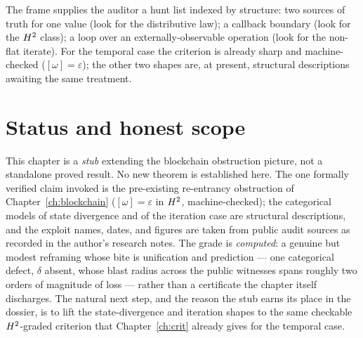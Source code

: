 The frame supplies the auditor a hunt list indexed by structure: two sources of
truth for one value (look for the distributive law); a callback boundary (look
for the $H^2$ class); a loop over an externally-observable operation (look for
the non-flat iterate). For the temporal case the criterion is already sharp and
machine-checked ($[\omega]=\varepsilon$); the other two shapes are, at present,
structural descriptions awaiting the same treatment.

\section{Status and honest scope}
\label{sec:security-status}

This chapter is a \emph{stub} extending the blockchain obstruction picture, not a
standalone proved result. No new theorem is established here. The one formally
verified claim invoked is the pre-existing re-entrancy obstruction of
Chapter~\ref{ch:blockchain} ($[\omega]=\varepsilon$ in $H^2$, machine-checked);
the categorical models of state divergence and of the iteration case are
structural descriptions, and the exploit names, dates, and figures are taken from
public audit sources as recorded in the author's research notes. The grade is
\emph{computed}: a genuine but modest reframing whose bite is unification and
prediction --- one categorical defect, $\delta$ absent, whose blast radius across
the public witnesses spans roughly two orders of magnitude of loss --- rather
than a certificate the chapter itself discharges. The natural next step, and the
reason the stub earns its place in the dossier, is to lift the state-divergence
and iteration shapes to the same checkable $H^2$-graded criterion that
Chapter~\ref{ch:crit} already gives for the temporal case.

